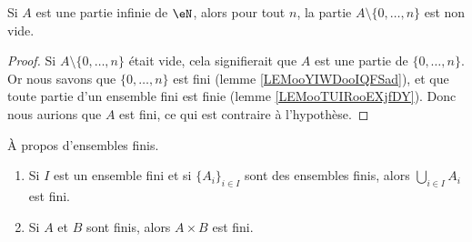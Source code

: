 \begin{lemma}       \label{LEMooRWUDooTgoRXH}
	Si \( A\) est une partie infinie de \( \eN\), alors pour tout \( n\), la partie \( A\setminus\{ 0,\ldots, n \}\) est non vide.
\end{lemma}

\begin{proof}
	Si \( A\setminus\{ 0,\ldots, n \}\) était vide, cela signifierait que \( A\) est une partie de \( \{ 0,\ldots, n \}\). Or nous savons que \( \{ 0,\ldots, n \}\) est fini (lemme \ref{LEMooYIWDooIQFSad}), et que toute partie d'un ensemble fini est finie (lemme \ref{LEMooTUIRooEXjfDY}). Donc nous aurions que \( A\) est fini, ce qui est contraire à l'hypothèse.
\end{proof}

\begin{proposition}	\label{PROPooOTHMooPzPzdW}
	À propos d'ensembles finis.
	\begin{enumerate}
		\item		\label{ITEMooFIEUooRmDcfo}
		      Si \( I\) est un ensemble fini et si \( \{ A_i \}_{i\in I}\) sont des ensembles finis, alors \( \bigcup_{i\in I}A_i\) est fini.
		\item		\label{ITEMooLVSVooHEwNWA}
		      Si \( A\) et \( B\) sont finis, alors \( A\times B\) est fini.
	\end{enumerate}
\end{proposition}

